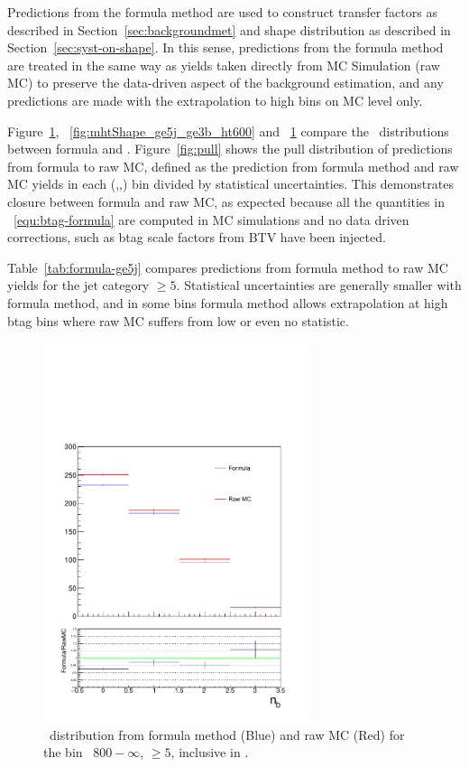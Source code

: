 Predictions from the formula method are used to construct transfer 
factors as described in Section~\ref{sec:backgroundmet} and \mht shape distribution
 as described in Section~\ref{sec:syst-on-shape}. In this sense, predictions from
 the formula method are treated in the same way as yields taken directly from MC
Simulation (raw MC) to preserve the 
 data-driven aspect of the background estimation, and any predictions are made
 with the extrapolation to high \nb bins on MC level only.

Figure~\ref{fig:mhtShape_ge5j_ge3b_ht800}, ~\ref{fig:mhtShape_ge5j_ge3b_ht600} and ~\ref{fig:mhtShape_ge5j_ge3b_ht800} 
compare the \nb~distributions between formula and . Figure~\ref{fig:pull} shows
the pull distribution of predictions from formula to raw MC, defined as the prediction from
 formula method and raw MC yields in each (\njet,\scalht,\mht) bin divided by statistical
 uncertainties. This demonstrates closure between formula and raw MC, as expected because 
 all the quantities in ~\ref{equ:btag-formula} are computed in MC simulations and 
 no data driven corrections, such as btag scale factors from BTV have been injected. 

Table~\ref{tab:formula-ge5j} compares
predictions from formula method to raw MC yields for the jet category \njet $\geq 5$. 
Statistical uncertainties are generally smaller with formula
method, and in some bins formula method allows extrapolation at high btag bins 
where raw MC suffers from low or even no statistic.



 \begin{figure}[h!]
  \centering
  \includegraphics[width=0.7\textwidth]{figures/btagformula/ge5j_800_0_Inc_GoodNb.pdf} 
  \caption{\label{fig:mhtShape_ge5j_ge3b_ht800} \nb~distribution from formula
   method (Blue) and raw MC (Red) for the bin \scalht~$800-\infty$, \njet $\geq 5$, inclusive
   in \mht.}
\end{figure}

